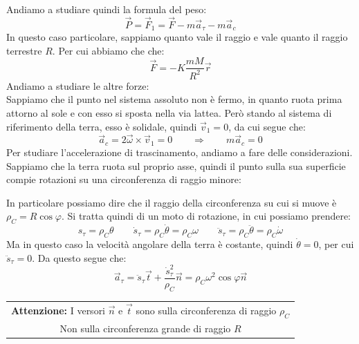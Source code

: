 \documentclass[11pt,a4paper,twoside]{article}
\theoremstyle{definition}
\begin{document}
Andiamo a studiare quindi la formula del peso:
\[ \vec P = \vec F_1 = \vec F - m\vec a_\tau - m\vec a_c \]
In questo caso particolare, sappiamo quanto vale il raggio e vale quanto il raggio terrestre $R$. Per cui abbiamo che che:
\[ \vec F = -K\frac{mM}{R^2}\vec r \]
Andiamo a studiare le altre forze:\\
Sappiamo che il punto nel sistema assoluto non è fermo, in quanto ruota prima attorno al sole e con esso si sposta nella via lattea. Però stando al sistema di riferimento della terra, esso è solidale, quindi $\vec v_1 = 0$, da cui segue che:
\[ \vec a_c = 2 \vec \omega \times \vec v_1 = 0 \qquad \Rightarrow \qquad m\vec a_c = 0 \]
Per studiare l'accelerazione di trascinamento, andiamo a fare delle considerazioni. Sappiamo che la terra ruota sul proprio asse, quindi il punto sulla sua superficie compie rotazioni su una circonferenza di raggio minore:
\begin{center}
\end{center}
In particolare possiamo dire che il raggio della circonferenza su cui si muove è $\rho_C = R \cos \varphi$. Si tratta quindi di un moto di rotazione, in cui possiamo prendere:
\[ s_\tau = \rho_C\theta  \qquad \dot s_\tau = \rho_C\dot \theta = \rho_C \omega \qquad \ddot s_\tau = \rho_C \ddot \theta = \rho_C \dot \omega \]
Ma in questo caso la velocità angolare della terra è costante, quindi $\dot \theta = 0$, per cui $\ddot s_\tau = 0$. Da questo segue che:
\[ \vec a_\tau = \ddot s_\tau \vec t + \frac{\dot s_\tau^2}{\rho_C} \vec n = \rho_C \omega^2 \cos \varphi \vec n \]
\begin{center}
	\begin{tabular}{|c|}
		\hline
		\textbf{Attenzione:} I versori $\vec n$ e $\vec t$ sono sulla circonferenza di raggio $\rho_C$\\
		Non sulla circonferenza grande di raggio $R$\\
		\hline
	\end{tabular}
\end{center}
\end{document}
